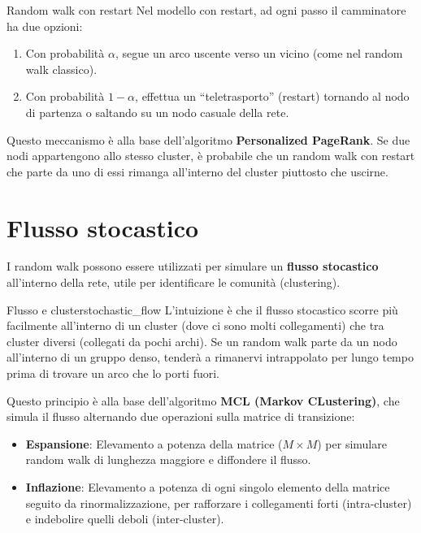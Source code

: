 \begin{nota}{Random walk con restart}{}
    Nel modello con restart, ad ogni passo il camminatore ha due opzioni:
    \begin{enumerate}
        \item Con probabilità $\alpha$, segue un arco uscente verso un vicino
        (come nel random walk classico).
        \item Con probabilità $1-\alpha$, effettua un ``teletrasporto''
        (restart) tornando al nodo di partenza o saltando su un nodo casuale
        della rete.
    \end{enumerate}
    Questo meccanismo è alla base dell'algoritmo \textbf{Personalized
    PageRank}. Se due nodi appartengono allo stesso cluster, è probabile che
    un random walk con restart che parte da uno di essi rimanga all'interno
    del cluster piuttosto che uscirne.
\end{nota}

\section{Flusso stocastico}
I random walk possono essere utilizzati per simulare un
\textbf{flusso stocastico} all'interno della rete, utile per identificare
le comunità (clustering).

\begin{definizione}{Flusso e cluster}{stochastic_flow}
    L'intuizione è che il flusso stocastico scorre più facilmente all'interno
    di un cluster (dove ci sono molti collegamenti) che tra cluster diversi
    (collegati da pochi archi).
    Se un random walk parte da un nodo all'interno di un gruppo denso,
    tenderà a rimanervi intrappolato per lungo tempo prima di trovare un arco
    che lo porti fuori.
\end{definizione}

Questo principio è alla base dell'algoritmo \textbf{MCL (Markov CLustering)},
che simula il flusso alternando due operazioni sulla matrice di transizione:
\begin{itemize}
    \item \textbf{Espansione}: Elevamento a potenza della matrice
    ($M \times M$) per simulare random walk di lunghezza maggiore e
    diffondere il flusso.
    \item \textbf{Inflazione}: Elevamento a potenza di ogni
    singolo elemento della matrice seguito da rinormalizzazione, per
    rafforzare i collegamenti forti (intra-cluster) e indebolire quelli
    deboli (inter-cluster).
\end{itemize}

